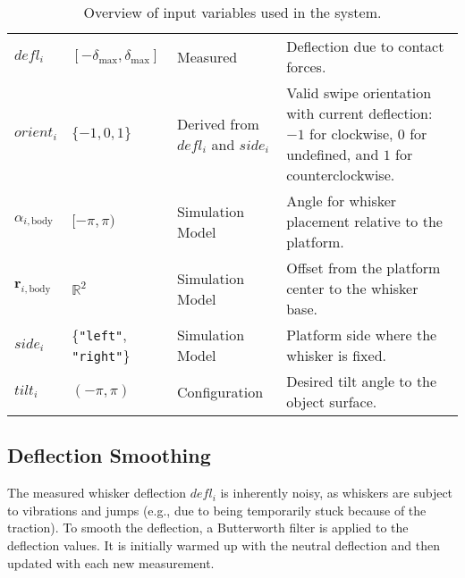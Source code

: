 \begin{table}[htb]
\begin{tabular}{p{1cm} p{2cm} p{3cm} p{7cm}}
        \midrule
        \(defl_{i}\)                            & \([-\delta_{\textrm{max}},\delta_{\textrm{max}}]\) & Measured                                   & Deflection due to contact forces.                                                                                           \\
        \(orient_{i}\)                          & \(\{-1, 0, 1\}\)                                   & Derived from \(defl_{i}\) and \(side_{i}\) & Valid swipe orientation with current deflection: \(-1\) for clockwise, \(0\) for undefined, and \(1\) for counterclockwise. \\
        \(\alpha_{i, \textrm{body}}\)           & \([-\pi,\pi)\)                                     & Simulation Model                           & Angle for whisker placement relative to the platform.                                                                       \\
        \(\boldsymbol{r}_{i, \textrm{body}}\)   & \(\mathbb{R}^2\)                                   & Simulation Model                           & Offset from the platform center to the whisker base.                                                                        \\
        \(side_{i}\)                            & \{\texttt{"left"}, \texttt{"right"}\}              & Simulation Model                           & Platform side where the whisker is fixed.                                                                                   \\
        \(tilt_{i}\)                            & \((-\pi,\pi)\)                                     & Configuration                              & Desired tilt angle to the object surface.                                                                                   \\
        \bottomrule
    \end{tabular}
    \caption{Overview of input variables used in the system.}
    \label{tab:variables}
\end{table}

\subsection{Deflection Smoothing}
The measured whisker deflection \(defl_{i}\) is inherently noisy, as whiskers are subject to vibrations and jumps (e.g., due to being temporarily stuck because of the traction).
To smooth the deflection, a Butterworth filter is applied to the deflection values.
It is initially warmed up with the neutral deflection and then updated with each new measurement.


